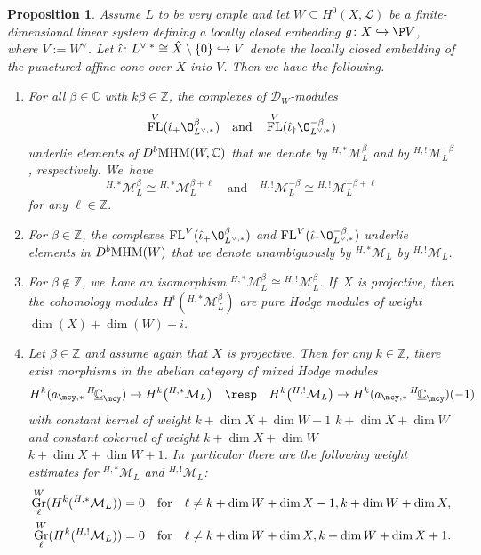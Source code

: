\documentclass[JEP,XML,SOM,Unicode,published]{cedram}
\let\mathds\mathbb
\newcommand\hto{\mathrel{\lhook\joinrel\to}}
\newcommand{\quand}{\quad\text{and}\quad}
\newtheorem{prop}[thm]{Proposition}
\newcommand{\dC}{{\mathds C}}\let\C\dC
\newcommand{\dZ}{{\mathds Z}}\let\mbz\dZ\let\Z\dZ
\newcommand{\Ell}{\mathscr{L}}
\newcommand{\cM}{\mathcal{M}}
\DeclareMathOperator{\FL}{\textup{FL}}
\DeclareMathOperator{\gr}{\textup{Gr}}
\newcommand{\MHM}{\textup{MHM}}
\newcommand{\Mh}{{^{H,*}}\cM_L^\beta}
\newcommand{\MhD}{{^{H,!}}\cM_L^{-\beta}}
\let\originalleft\left
\let\originalright\right
\renewcommand{\left}{\mathopen{}\mathclose\bgroup\originalleft}
\renewcommand{\right}{\aftergroup\egroup\originalright}
\begin{document}
\begin{prop} \label{prop:directImageOfOBetaMHM}
Assume $L$ to be very ample and let $W \subseteq H^0(X,\Ell)$ be a finite-dimensional linear system defining a locally closed embedding $g \colon X \hto \P V$, where $V := W^\vee$. Let $\hat\iota \colon L^{\vee,*} \cong \hat{X} \setminus \{0\} \hto V$ denote the locally closed embedding of the punctured affine cone over $X$ into $V$. Then we have the following.
\begin{enumerate}
\item\label{prop:directImageOfOBetaMHM1}
For all $\beta \in \C$ with $k\beta \in \Z$, the complexes of $\mathscr D_W$\nobreakdash-mod\-ules
\[
\FL^V(\hat\iota_+ \O_{L^{\vee,*}}^\beta)
\quand
\FL^V(\hat\iota_\dag \O_{L^{\vee,*}}^{-\beta})
\]
underlie elements of $D^b\MHM(W,\dC)$
that we denote by $\Mh$ and by $\MhD$, respectively. We~have
\[
\Mh \cong {^{H,*}}\cM_L^{\beta+\ell}
\quand
\MhD \cong {^{H,!}}\cM_L^{-\beta+\ell}
\]
for any $\ell\in \dZ$.
\item\label{prop:directImageOfOBetaMHM2}
For $\beta\in \dZ$, the complexes $\FL^V(\hat\iota_+ \O_{L^{\vee,*}}^\beta)$ and $\FL^V(\hat\iota_\dag \O_{L^{\vee,*}}^{-\beta})$ underlie elements in $D^b\MHM(W)$
that we denote unambiguously by ${^{H,*}}\cM_L$ \resp by ${^{H,!}}\cM_L$.

\item\label{prop:directImageOfOBetaMHM3}
For $\beta \notin \dZ$, we~have an isomorphism
$\Mh \cong {^{H,!}}\cM_L^{\beta}$. If~$X$ is projective, then the cohomology modules
$H^i(\Mh)$ are pure Hodge modules of weight $\dim(X)+\dim(W)+i$.

\item\label{prop:directImageOfOBetaMHM4}
Let $\beta\in\dZ$ and assume again that $X$ is projective. Then for any $k\in \dZ$,
there exist morphisms in the abelian category of mixed Hodge modules
\[
H^k(a_{\mcy,*} \, ^{H\!}\underline{\dC}_{\mcy}) \to H^{k} \left({^{H,*}}\cM_L\right) \quad \text{\resp} \quad H^{k} \left({^{H,!}}\cM_L\right) \to H^k(a_{\mcy,*} \, ^{H\!}\underline{\dC}_{\mcy})(-1)
\]
with constant kernel of weight $k+ \dim X + \dim W -1$ \resp $k+ \dim X + \dim W$ and constant cokernel of weight $k+ \dim X + \dim W $ \resp $k+ \dim X + \dim W+1$. In~particular there are the following weight estimates for ${^{H,*}}\cM_L$ and ${^{H,!}}\cM_L$:
\begin{align*}
\gr^W_\ell (H^k({^{H,*}}\cM_L)) = 0 &\quad \text{for} \quad \ell \neq k+ \dim W +\dim X -1,k+ \dim W +\dim X,\\
\gr^W_\ell (H^k({^{H,!}}\cM_L)) = 0 &\quad \text{for} \quad \ell \neq k+ \dim W +\dim X,k+ \dim W +\dim X+1.
\end{align*}
\end{enumerate}
\end{prop}
\end{document}
